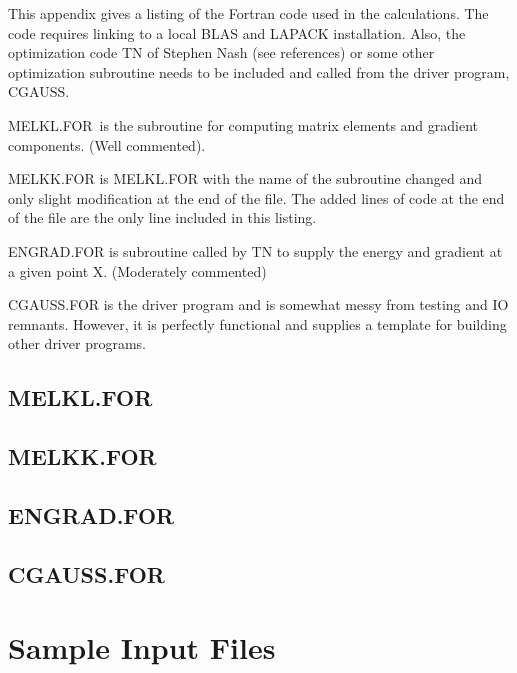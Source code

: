 \documentclass[12pt,thmsa,suthesis,verbatim]{report}
\begin{document}
This appendix gives a listing of the Fortran code used in the calculations.
The code requires linking to a local BLAS and LAPACK installation. Also, the
optimization code TN of Stephen Nash (see references) or some other
optimization subroutine needs to be included and called from the driver
program, CGAUSS.

MELKL.FOR\ is the subroutine for computing matrix elements and gradient
components. (Well commented).

MELKK.FOR is MELKL.FOR with the name of the subroutine changed and only
slight modification at the end of the file. The added lines of code at the
end of the file are the only line included in this listing.

ENGRAD.FOR is subroutine called by TN to supply the energy and gradient at a
given point X. (Moderately commented)

CGAUSS.FOR is the driver program and is somewhat messy from testing and IO
remnants. However, it is perfectly functional and supplies a template for
building other driver programs.

\section{MELKL.FOR}

{\normalsize \renewcommand{\baselinestretch}{1} \footnotesize %
 }

\section{MELKK.FOR}

{\normalsize \renewcommand{\baselinestretch}{1} \footnotesize %
 }

\section{ENGRAD.FOR}

{\normalsize \renewcommand{\baselinestretch}{1} \footnotesize %
 }

\section{CGAUSS.FOR}

{\normalsize \renewcommand{\baselinestretch}{1} \footnotesize %
 }

\chapter{Sample Input Files}
\end{document}
